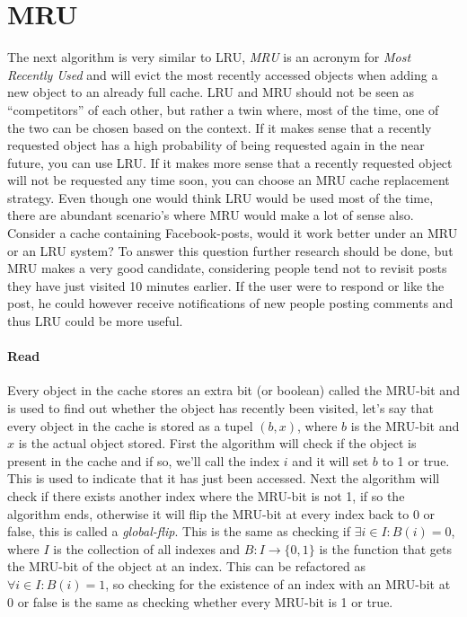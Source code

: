 \documentclass[pdftex,a4paper,12pt,twoside]{report}
\begin{document}
\section{MRU}
The next algorithm is very similar to LRU, \emph{MRU} is an acronym for \emph{Most Recently Used} and will evict the most recently accessed objects when adding a new object to an already full cache. LRU and MRU should not be seen as ``competitors'' of each other, but rather a twin where, most of the time, one of the two can be chosen based on the context.
If it makes sense that a recently requested object has a high probability of being requested again in the near future, you can use LRU. If it makes more sense that a recently requested object will not be requested any time soon, you can choose an MRU cache replacement strategy. Even though one would think LRU would be used most of the time, there are abundant scenario's where MRU would make a lot of sense also. Consider a cache containing Facebook-posts, would it work better under an MRU or an LRU system? To answer this question further research should be done, but MRU makes a very good candidate, considering people tend not to revisit posts they have just visited 10 minutes earlier. If the user were to respond or like the post, he could however receive notifications of new people posting comments and thus LRU could be more useful.
\paragraph{Read} Every object in the cache stores an extra bit (or boolean) called the MRU-bit and is used to find out whether the object has recently been visited, let's
say that every object in the cache is stored as a tupel $(b,x)$, where $b$ is the MRU-bit and $x$ is the actual object stored. First the algorithm will check if the object is present in the cache and if so, we'll call the index $i$ and it will set $b$ to 1 or true. This is used to indicate that it has just been accessed. Next the algorithm will check if there exists another index where the MRU-bit is not 1, if so the algorithm ends, otherwise it will flip the MRU-bit at every index back to 0 or false, this is called a 
\emph{global-flip}. This is the same as checking if $\exists i \in I : B(i) = 0$, where $I$ is the collection of all indexes and $B : I \to \{0,1\}$ is the function that gets the MRU-bit of the object at an index. This can be refactored as $\forall i \in I : B(i) = 1$, so checking for the existence of an index with an MRU-bit at 0 or false is the same as checking whether every MRU-bit is 1 or true.
\end{document}
